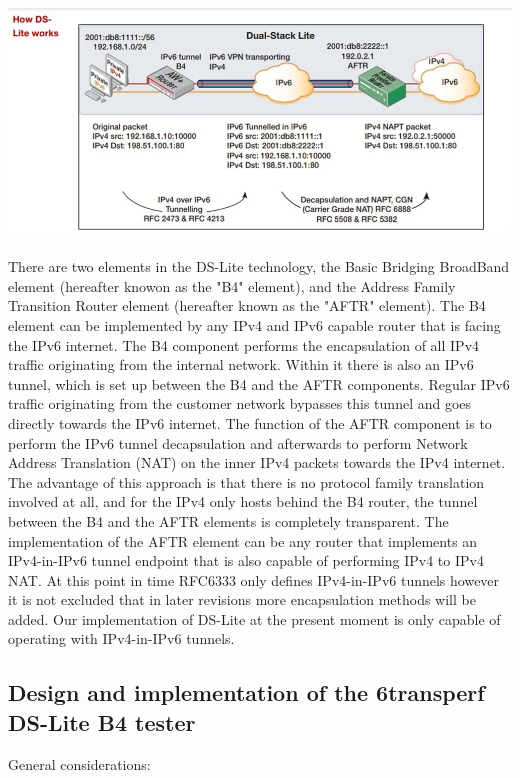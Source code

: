 \documentclass[a4paper,12p,titlepage]{article}
\begin{document}
\includegraphics[width=\textwidth]{dslitehighlevel}

There are two elements in the DS-Lite technology, the Basic Bridging BroadBand element (hereafter knowon as the "B4" element), and the Address Family Transition Router element (hereafter known as the "AFTR" element). The B4 element can be implemented by any IPv4 and IPv6 capable router that is facing the IPv6 internet. The B4 component performs the encapsulation of all IPv4 traffic originating from the internal network. Within it there is also an IPv6 tunnel, which is set up between the B4 and the AFTR components. Regular IPv6 traffic originating from the customer network bypasses this tunnel and goes directly towards the IPv6 internet. The function of the AFTR component is to perform the IPv6 tunnel decapsulation and afterwards to perform Network Address Translation (NAT) on the inner IPv4 packets towards the IPv4 internet.
The advantage of this approach is that there is no protocol family translation involved at all, and for the IPv4 only hosts behind the B4 router, the tunnel between the B4 and the AFTR elements is completely transparent.
The implementation of the AFTR element can be any router that implements an IPv4-in-IPv6 tunnel endpoint that is also capable of performing IPv4 to IPv4 NAT. At this point in time RFC6333 only defines IPv4-in-IPv6 tunnels however it is not excluded that in later revisions more encapsulation methods will be added. Our implementation of DS-Lite at the present moment is only capable of operating with IPv4-in-IPv6 tunnels.

\subsection{Design and implementation of the 6transperf DS-Lite B4 tester}
General considerations:
\end{document}
